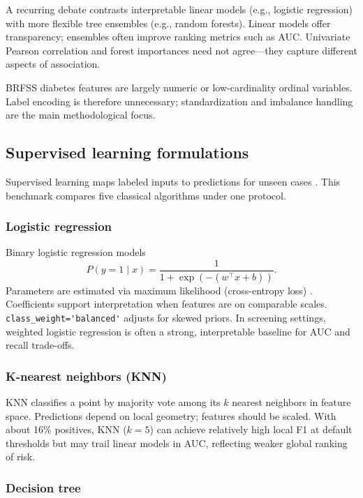 \documentclass[11pt,a4paper]{article}
\begin{document}
A recurring debate contrasts interpretable linear models (e.g., logistic regression) with more flexible tree ensembles (e.g., random forests). Linear models offer transparency; ensembles often improve ranking metrics such as AUC. Univariate Pearson correlation and forest importances need not agree---they capture different aspects of association.

BRFSS diabetes features are largely numeric or low-cardinality ordinal variables. Label encoding is therefore unnecessary; standardization and imbalance handling are the main methodological focus.

\subsection{Supervised learning formulations}\label{sec:theory-sl}

Supervised learning maps labeled inputs to predictions for unseen cases \citep{James2021}. This benchmark compares five classical algorithms under one protocol.

\subsubsection{Logistic regression}

Binary logistic regression models
\begin{equation}
P(y=1\mid x)=\frac{1}{1+\exp(-(w^{\top}x+b))}.
\end{equation}
Parameters are estimated via maximum likelihood (cross-entropy loss) \citep{Hosmer2013}. Coefficients support interpretation when features are on comparable scales. \lstinline{class_weight='balanced'} adjusts for skewed priors. In screening settings, weighted logistic regression is often a strong, interpretable baseline for AUC and recall trade-offs.

\subsubsection{K-nearest neighbors (KNN)}

KNN classifies a point by majority vote among its $k$ nearest neighbors in feature space. Predictions depend on local geometry; features should be scaled. With about 16\% positives, KNN ($k=5$) can achieve relatively high local F1 at default thresholds but may trail linear models in AUC, reflecting weaker global ranking of risk.

\subsubsection{Decision tree}
\end{document}
